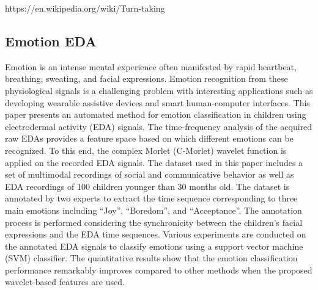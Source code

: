 https://en.wikipedia.org/wiki/Turn-taking

\subsection{Emotion EDA}
Emotion is an intense mental experience often manifested by rapid heartbeat, breathing, 
sweating, and facial expressions. Emotion recognition from these physiological signals 
is a challenging problem with interesting applications such as developing wearable 
assistive devices and smart human-computer interfaces. This paper presents an automated 
method for emotion classification in children using electrodermal activity (EDA) signals. 
The time-frequency analysis of the acquired raw EDAs provides a feature space based on 
which different emotions can be recognized. To this end, the complex Morlet (C-Morlet) 
wavelet function is applied on the recorded EDA signals. The dataset used in this paper 
includes a set of multimodal recordings of social and communicative behavior as well 
as EDA recordings of 100 children younger than 30 months old. The dataset is annotated 
by two experts to extract the time sequence corresponding to three main emotions 
including “Joy”, “Boredom”, and “Acceptance”. The annotation process is performed 
considering the synchronicity between the children's facial expressions and the EDA 
time sequences. Various experiments are conducted on the annotated EDA signals to 
classify emotions using a support vector machine (SVM) classifier. The quantitative 
results show that the emotion classification performance remarkably improves compared 
to other methods when the proposed wavelet-based features are used.


